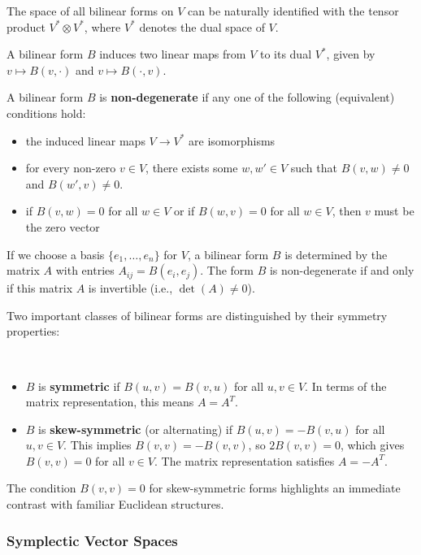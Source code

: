 The space of all bilinear forms on $V$ can be naturally identified with the tensor product $V^* \otimes V^*$, where $V^*$ denotes the dual space of $V$.

A bilinear form $B$ induces two linear maps from $V$ to its dual $V^*$, given by $v \mapsto B(v, \cdot)$ and $v \mapsto B(\cdot, v)$.

\begin{definition}
A bilinear form $B$ is \textbf{non-degenerate} if any one of the following (equivalent) conditions hold:
\begin{itemize}
    \item the induced linear maps $V \to V^*$ are isomorphisms
    \item for every non-zero $v \in V$, there exists some $w, w' \in V$ such that $B(v, w) \neq 0$ and $B(w',v)\neq 0$.
    \item if $B(v, w) = 0$ for all $w \in V$ or if $B(w, v) = 0$ for all $w \in V$, then $v$ must be the zero vector
\end{itemize}

\end{definition}

If we choose a basis $\{e_1, \dots, e_n\}$ for $V$, a bilinear form $B$ is determined by the matrix $A$ with entries $A_{ij} = B(e_i, e_j)$. The form $B$ is non-degenerate if and only if this matrix $A$ is invertible (i.e., $\det(A) \neq 0$).

Two important classes of bilinear forms are distinguished by their symmetry properties:
\begin{definition}
\,
    \begin{itemize}
    \item $B$ is \textbf{symmetric} if $B(u, v) = B(v, u)$ for all $u, v \in V$. In terms of the matrix representation, this means $A = A^T$.
    \item $B$ is \textbf{skew-symmetric} (or alternating) if $B(u, v) = -B(v, u)$ for all $u, v \in V$. This implies $B(v, v) = -B(v, v)$, so $2 B(v, v) = 0$, which gives $B(v, v) = 0$ for all $v \in V$. The matrix representation satisfies $A = -A^T$.
\end{itemize}
\end{definition}
The condition $B(v, v) = 0$ for skew-symmetric forms highlights an immediate contrast with familiar Euclidean structures.

\subsubsection{Symplectic Vector Spaces}

